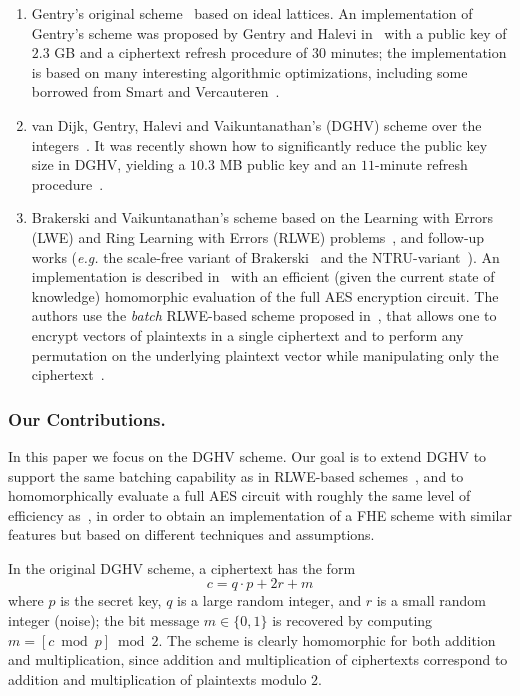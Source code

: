 \documentclass{llncs}
\newcommand{\eg}{\textsl{e.g.}\xspace}
\begin{document}
\begin{enumerate}
\item Gentry's original scheme~\cite{GenPhD} based on ideal
  lattices.  An implementation of Gentry's scheme was proposed by
  Gentry and Halevi
  in~\cite{GH2011} with a public key of $2.3$ GB and a ciphertext
  refresh procedure of $30$ minutes; the implementation is based on
  many interesting algorithmic
  optimizations, including some borrowed from Smart and Vercauteren~\cite{SV2010}.

\smallskip

\item van Dijk, Gentry, Halevi and Vaikuntanathan's (DGHV) scheme over the
  integers~\cite{vDGHV2010}. It was recently shown how to significantly
  reduce the public key size in DGHV, yielding a $10.3$ MB public key and
  an $11$-minute refresh procedure~\cite{CNT2012}.

\smallskip

\item Brakerski and Vaikuntanathan's scheme based on the Learning with
  Errors (LWE)  and Ring Learning with Errors (RLWE)
  problems~\cite{BV2011a,BV2011b}, and follow-up works (\eg the scale-free variant of Brakerski~\cite{Bra2012} and the NTRU-variant~\cite{LTV2012}). An implementation is described in~\cite{GHS2012c} with an 
  efficient (given the current state of knowledge)
  homomorphic evaluation of the full AES encryption circuit.  The
  authors use the \emph{batch} RLWE-based scheme proposed in~\cite{BGV2012,GHS2012a},
  that allows one to
 encrypt vectors of plaintexts in a single ciphertext and to
 perform any permutation on the underlying plaintext vector while
 manipulating only the ciphertext~\cite{SV2011}. 
\end{enumerate}

\subsubsection{Our Contributions.} 

In this paper we focus on the DGHV scheme. Our goal is to extend DGHV to
support the same batching capability %
as in RLWE-based
schemes~\cite{BGV2012,GHS2012a}, and to homomorphically evaluate a full AES
circuit with roughly the same level of efficiency as~\cite{GHS2012c}, in
order to obtain an implementation of a FHE scheme with similar features
but based on different techniques and assumptions. 

In the original DGHV scheme, a ciphertext has the form
$$ c= q \cdot p + 2r+m$$
where $p$ is the secret key, $q$ is a large random integer, and $r$ is
a small random integer (noise); the bit message $m\in\{0,1\}$ is recovered by computing
$m=[c \bmod p]\bmod 2$.  The scheme is clearly homomorphic for both addition
and multiplication, since addition and multiplication of ciphertexts
correspond to addition and multiplication of plaintexts modulo
$2$. 
\end{document}
